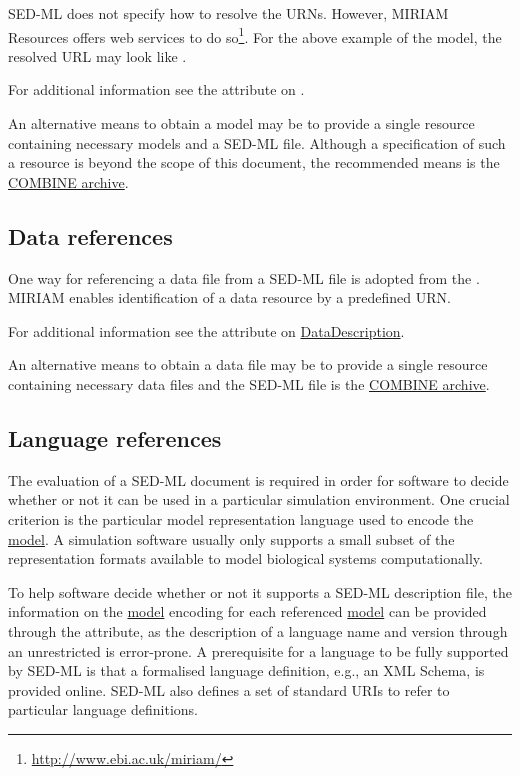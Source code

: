 SED-ML does not specify how to resolve the URNs. However, MIRIAM Resources offers web services to do so\footnote{\url{http://www.ebi.ac.uk/miriam/}}. For the above example of the  model, the resolved URL may look like .

For additional information see the \hyperref[sec:model_source]{} attribute on \Model.

An alternative means to obtain a model may be to provide a single resource containing necessary models and a SED-ML file. Although a specification of such a resource is beyond the scope of this document, the recommended means is the \hyperref[sec:archive]{COMBINE archive}.


\subsection{Data references}
\label{sec:dataURI}
One way for referencing a data file from a SED-ML file is adopted from the . MIRIAM enables identification of a data resource by a predefined URN. 

For additional information see the \hyperref[sec:data_source]{} attribute on \hyperref[class:dataDescription]{DataDescription}.

An alternative means to obtain a data file may be to provide a single resource containing necessary data files and the SED-ML file is the \hyperref[sec:archive]{COMBINE archive}. 


\subsection{Language references}
\label{sec:languageURI}
The evaluation of a SED-ML document is required in order for software to decide whether or not it can be used in a particular simulation environment. One crucial criterion is the particular model representation language used to encode the \hyperref[class:model]{model}. A simulation software usually only supports a small subset of the representation formats available to model biological systems computationally. 

To help  software decide whether or not it supports a SED-ML description file, the information on the \hyperref[class:model]{model} encoding for each referenced \hyperref[class:model]{model} can be provided through the \hyperref[sec:language]{} attribute, as the description of a language name and version through an unrestricted  is error-prone. 
A prerequisite for a language to be fully supported by SED-ML is that a formalised language definition, e.g., an XML Schema, is provided online. SED-ML also defines a set of standard URIs to refer to particular language definitions. 

